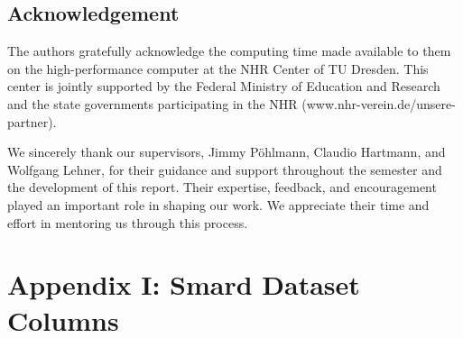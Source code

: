 \documentclass[a4paper]{article}
\begin{document}
    \vspace{10em}\subsection{Acknowledgement}\label{acknowledgement}

The authors gratefully acknowledge the computing time made available to
them on the high-performance computer at the NHR Center of TU Dresden.
This center is jointly supported by the Federal Ministry of Education
and Research and the state governments participating in the NHR
(www.nhr-verein.de/unsere-partner).

We sincerely thank our supervisors, Jimmy Pöhlmann, Claudio Hartmann,
and Wolfgang Lehner, for their guidance and support throughout the
semester and the development of this report. Their expertise, feedback,
and encouragement played an important role in shaping our work. We
appreciate their time and effort in mentoring us through this process.

    \newpage\appendix
\section{Appendix I: Smard Dataset
Columns}\label{appendix-i-smard-dataset-columns}
\end{document}
